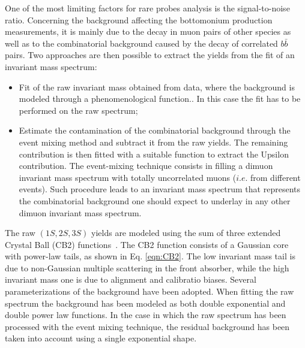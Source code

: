 One of the most limiting factors for rare probes analysis is the signal-to-noise ratio.
Concerning the background affecting the bottomonium production measurements, it is mainly due to the decay in muon pairs of other species as well as to the combinatorial background caused by the decay of correlated $b\bar{b}$ pairs.
Two approaches are then possible to extract the yields from the fit of an invariant mass spectrum:
\begin{itemize}
\item Fit of the raw invariant mass obtained from data, where the background is modeled through a phenomenological function.. In this case the fit has to be performed on the raw spectrum;
\item Estimate the contamination of the combinatorial background through the event mixing method and subtract it from the raw yields. The remaining contribution is then fitted with a suitable function to extract the Upsilon contribution. The event-mixing technique consists in filling a dimuon invariant mass spectrum with totally uncorrelated muons ($i.e.$ from different events). Such procedure leads to an invariant mass spectrum that represents the combinatorial background one should expect to underlay in any other dimuon invariant mass spectrum.
\end{itemize}

The raw \upsi$(1S,2S,3S)$ yields are modeled using the sum of three extended Crystal Ball (CB2) functions~\cite{ALICE-Quarkonia-signal-extraction}. 
The CB2 function consists of a Gaussian core with  power-law tails, as shown in Eq. \ref{eqn:CB2}.
The low invariant mass tail is due to non-Gaussian multiple scattering in the front absorber, while the high invariant mass one is due to alignment and calibratio biases.
Several parameterizations of the background have been adopted.
When fitting the raw spectrum the background has been modeled as both double exponential and double power law functions.
In the case in which the raw spectrum has been processed with the event mixing technique, the residual background has been taken into account using a single exponential shape.

